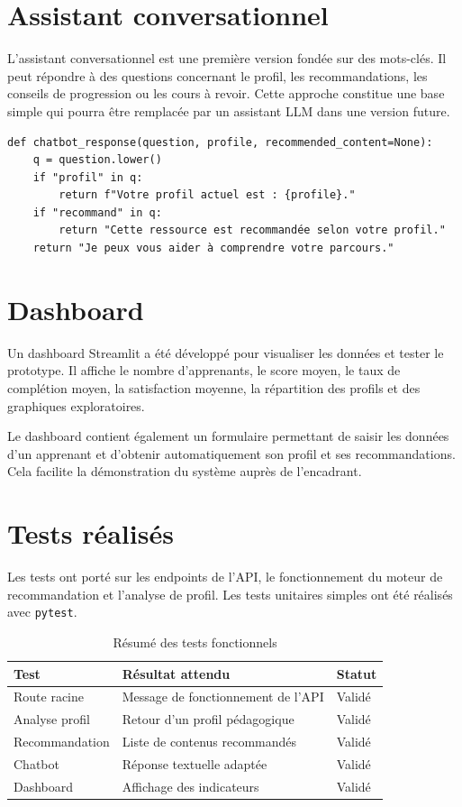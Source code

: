 \documentclass[12pt,a4paper]{report}
\begin{document}
\section{Assistant conversationnel}

L'assistant conversationnel est une première version fondée sur des mots-clés. Il peut répondre à des questions concernant le profil, les recommandations, les conseils de progression ou les cours à revoir. Cette approche constitue une base simple qui pourra être remplacée par un assistant LLM dans une version future.

\begin{lstlisting}[style=pythonstyle,caption={Exemple simplifié de réponse conversationnelle}]
def chatbot_response(question, profile, recommended_content=None):
    q = question.lower()
    if "profil" in q:
        return f"Votre profil actuel est : {profile}."
    if "recommand" in q:
        return "Cette ressource est recommandée selon votre profil."
    return "Je peux vous aider à comprendre votre parcours."
\end{lstlisting}

\section{Dashboard}

Un dashboard Streamlit a été développé pour visualiser les données et tester le prototype. Il affiche le nombre d'apprenants, le score moyen, le taux de complétion moyen, la satisfaction moyenne, la répartition des profils et des graphiques exploratoires.

Le dashboard contient également un formulaire permettant de saisir les données d'un apprenant et d'obtenir automatiquement son profil et ses recommandations. Cela facilite la démonstration du système auprès de l'encadrant.

\section{Tests réalisés}

Les tests ont porté sur les endpoints de l'API, le fonctionnement du moteur de recommandation et l'analyse de profil. Les tests unitaires simples ont été réalisés avec \texttt{pytest}.

\begin{table}[H]
\centering
\caption{Résumé des tests fonctionnels}
\begin{tabular}{|p{4cm}|p{5cm}|p{3cm}|}
\hline
\textbf{Test} & \textbf{Résultat attendu} & \textbf{Statut} \\
\hline
Route racine & Message de fonctionnement de l'API & Validé \\
\hline
Analyse profil & Retour d'un profil pédagogique & Validé \\
\hline
Recommandation & Liste de contenus recommandés & Validé \\
\hline
Chatbot & Réponse textuelle adaptée & Validé \\
\hline
Dashboard & Affichage des indicateurs & Validé \\
\hline
\end{tabular}
\end{table}
\end{document}
